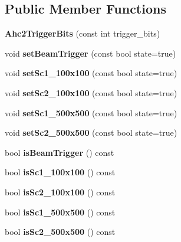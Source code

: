 \subsection*{Public Member Functions}
\begin{DoxyCompactItemize}
\item 
{\bfseries Ahc2\-Trigger\-Bits} (const int trigger\-\_\-bits)\label{classCALICE_1_1Ahc2TriggerBits_a89ad730200f80e923e0ec08181568a14}

\item 
void {\bfseries set\-Beam\-Trigger} (const bool state=true)\label{classCALICE_1_1Ahc2TriggerBits_a968dc35e8fd8e6cb9d421e98f9265db5}

\item 
void {\bfseries set\-Sc1\-\_\-100x100} (const bool state=true)\label{classCALICE_1_1Ahc2TriggerBits_a07d1b59ef322255420f02296ad1a449b}

\item 
void {\bfseries set\-Sc2\-\_\-100x100} (const bool state=true)\label{classCALICE_1_1Ahc2TriggerBits_a4d808a2272ce45333088a8b622b339a4}

\item 
void {\bfseries set\-Sc1\-\_\-500x500} (const bool state=true)\label{classCALICE_1_1Ahc2TriggerBits_a867edfd10460deeb66dcb597b62cc5f9}

\item 
void {\bfseries set\-Sc2\-\_\-500x500} (const bool state=true)\label{classCALICE_1_1Ahc2TriggerBits_aa6e7caf3a22c7ba80494c0b0bf819946}

\item 
bool {\bfseries is\-Beam\-Trigger} () const \label{classCALICE_1_1Ahc2TriggerBits_a6ddabf7d7159fbdb161ef5771df58d0b}

\item 
bool {\bfseries is\-Sc1\-\_\-100x100} () const \label{classCALICE_1_1Ahc2TriggerBits_ae40cacdbfe09dd9f8a1671be90ce06d6}

\item 
bool {\bfseries is\-Sc2\-\_\-100x100} () const \label{classCALICE_1_1Ahc2TriggerBits_a701f7ea3424da265e127bc256e86662c}

\item 
bool {\bfseries is\-Sc1\-\_\-500x500} () const \label{classCALICE_1_1Ahc2TriggerBits_aa0b8216333443b92de1a00fdf6e6b32a}

\item 
bool {\bfseries is\-Sc2\-\_\-500x500} () const \label{classCALICE_1_1Ahc2TriggerBits_a6f621752d5d0e0786bb8976548da8c25}

\end{DoxyCompactItemize}


